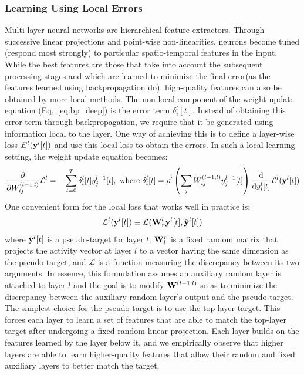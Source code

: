 \documentclass[journal,onecolumn,11pt]{IEEEtran}
\begin{document}
\subsubsection{Learning Using Local Errors} 
Multi-layer neural networks are hierarchical feature extractors.
Through successive linear projections and point-wise non-linearities, neurons become tuned (respond most strongly) to particular spatio-temporal features in the input.
While the best features are those that take into account the subsequent processing stages and which are learned to minimize the final error(as the features learned using backpropagation do), high-quality features can also be obtained by more local methods.
The non-local component of the weight update equation (Eq.~\eqref{eq:bp_deep}) is the error term $\delta_i^l[t]$.
Instead of obtaining this error term through backpropagation, we require that it be generated using information local to the layer. 
One way of achieving this is to define a layer-wise loss $E^l({\bf y}^l[t])$ and use this local loss to obtain the errors.
In such a local learning setting, the weight update equation becomes:
%
\begin{equation}\label{eq:bp_local}
  \frac{\mathrm{\partial}}{\mathrm{\partial} W^{(l-1,l)}_{ij}} \mathcal{L}^l = -\sum_{t=0}^T \delta_{i}^{l}[t]  y^{l-1}_j[t],
    \text{ where }
    \delta_{i}^{l} [t] = \rho'\left(\sum_j W^{(l-1,l)}_{ij} y^{l-1}_j [t] \right) \frac{\mathrm{d}}{\mathrm{d}y_i^l[t]}\mathcal{L}^l({\bf y}^l[t])
\end{equation}
One convenient form for the local loss that works well in practice is:
\begin{equation}
\mathcal{L}^l({\bf y}^l[t]) \equiv \mathcal{L}({\bf W}^l_{r} {\bf y}^l[t],\hat{{\bf y}}^{l}[t])
\end{equation}
%
where $\hat{{\bf y}}^{l}[t]$ is a pseudo-target for layer $l$, ${\bf W}_l^{r}$ is a fixed random matrix that projects the activity vector at layer $l$ to a vector having the same dimension as the pseudo-target, and $\mathcal{L}$ is a function measuring the discrepancy between its two arguments.
In essence, this formulation assumes an auxiliary random layer is attached to layer $l$ and the goal is to modify ${\bf W}^{(l-1,l)}$ so as to minimize the discrepancy between the auxiliary random layer's output and the pseudo-target. 
The simplest choice for the pseudo-target is to use the top-layer target. 
This forces each layer to learn a set of features that are able to match the top-layer target after undergoing a fixed random linear projection. Each layer builds on the features learned by the layer below it, and we empirically observe that higher layers are able to learn higher-quality features that allow their random and fixed auxiliary layers to better match the target.
\label{sec:spatial_credit_assignment}
\end{document}
